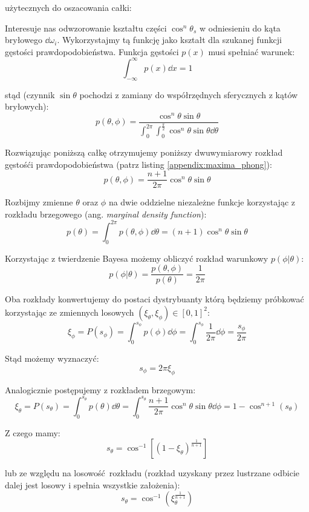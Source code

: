\documentclass[../main.tex]{subfiles}
\begin{document}
\noindent użytecznych do oszacowania całki:

Interesuje nas odwzorowanie kształtu części $\cos^{n}\theta_s$ w odniesieniu do kąta bryłowego
$\dd \omega_i$. Wykorzystajmy tą funkcję jako kształt dla szukanej funkcji gęstości
prawdopodobieństwa. Funkcja gęstości $p(x)$ musi spełniać warunek:
\[ 
\int_{-\infty}^{\infty} p(x) \dd x = 1 
\]

\noindent stąd (czynnik $\sin\theta$ pochodzi z zamiany do współrzędnych
sferycznych z kątów bryłowych):
\[
  p(\theta, \phi) = \frac{
    \cos^{n}{\theta} \sin\theta
  }{
    \int_{0}^{2\pi} \int_{0}^{\frac{\pi}{2}} {
      \cos^{n}{\theta} \sin\theta \dd \theta
    }
  }
\]

Rozwiązując poniższą całkę otrzymujemy poniższy dwuwymiarowy rozkład gęstośći
prawdopodobieństwa (patrz listing \ref{appendix:maxima_phong}):
\[
  p(\theta, \phi) =
    \frac{n+1}{2\pi} \cos^{n}\theta \sin\theta
\]

Rozbijmy zmienne $\theta$ oraz $\phi$ na dwie oddzielne niezależne funkcje
korzystając z rozkładu brzegowego (ang. \textit{marginal density function}):
\[
  p(\theta) = \int_{0}^{2\pi} {
    p(\theta, \phi) \dd \theta
  } =
  (n+1) \cos^{n}{\theta} \sin\theta
\]

Korzystając z twierdzenie Bayesa możemy obliczyć rozkład warunkowy $p(\phi | \theta)$:
\[
  p(\phi | \theta) = \frac{
    p(\theta, \phi)
	}{
		p(\theta)
	} = \frac{1}{2\pi}
\]

Oba rozkłady konwertujemy do postaci dystrybuanty którą będziemy próbkować
korzystając ze zmiennych losowych $(\xi_{\theta}, \xi_{\phi}) \in [0,1]^2$:
\[
	\xi_\phi = P(s_{\phi}) =
	\int_{0}^{s_{\phi}} {
		p(\phi) \dd \phi
	} =
	\int_{0}^{s_{\phi}} {
		\frac{1}{2\pi} \dd \phi
	} =
	\frac{s_{\phi}}{2\pi}
\]

Stąd możemy wyznaczyć:
\[
	s_{\phi} = 2 \pi \xi_{\phi}
\]

Analogicznie postępujemy z rozkładem brzegowym:
\[
  \xi_{\theta} = P(s_{\theta}) =
	\int_{0}^{s_{\theta}} {
		p(\theta) \dd \theta
	} =
	\int_{0}^{s_{\theta}} {
		\frac{n+1}{2\pi} \cos^{n}\theta \sin\theta \dd\phi
	} =
	1 - \cos^{n+1}(s_{\theta})
\]

Z czego mamy:
\[
	s_{\theta} =
	\cos^{-1}\left[
		(1 - \xi_{\theta})^{\frac{1}{n+1}}
	\right]
\]

lub ze względu na losowość rozkładu (rozkład uzyskany przez lustrzane odbicie
dalej jest losowy i spełnia wszystkie założenia):
\[
	s_{\theta} =
	\cos^{-1}\left(
		\xi_{\theta}^{\frac{1}{n+1}}
	\right)
\]
\end{document}

